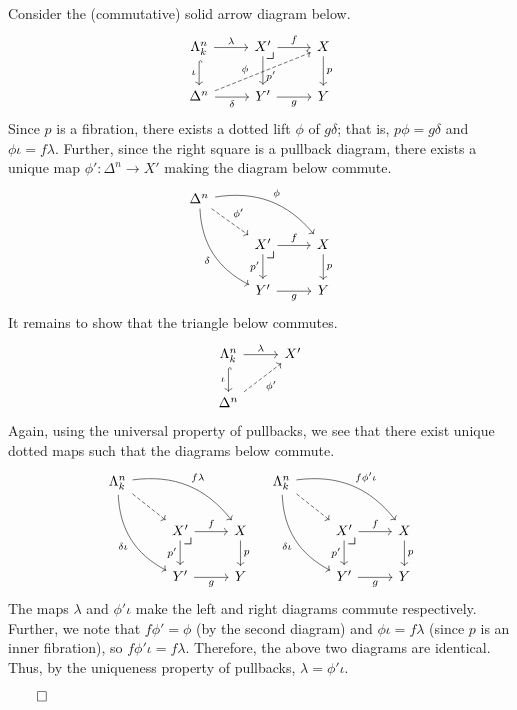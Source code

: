 \documentclass{MetricNotes2023}
\def\done{\begin{flushright}\(\qed\)\end{flushright}}
\begin{document}
\begin{ourproof}
Consider the (commutative) solid arrow diagram below.
\[\begin{tikzcd}
\Lambda^n_k \arrow[r, "\lambda"] \arrow[d, hookrightarrow, swap, "\iota"]  & X' \arrow[d, "p'" {yshift=-4pt}] \arrow[r, "f"] \arrow[dr, phantom, "\scalebox{1.3}{$\lrcorner$}" {xshift=-16pt, yshift=12pt}] & X \arrow[d, "p"]  \\
\Delta^n \arrow[r, swap, "\delta"] \arrow[urr, dashrightarrow, "\phi" {xshift=-8pt, yshift=-4pt}]  & Y' \arrow[r, swap, "g"] & Y
\end{tikzcd}\]
Since \(p\) is a fibration, there exists a dotted lift \(\phi\) of \(g \delta\); that is, \(p\phi = g \delta\) and \(\phi \iota = f \lambda\). Further, since the right square is a pullback diagram, there exists a unique map \(\phi' : \Delta^n \to X'\) making the diagram below commute.
\[\begin{tikzcd}
\Delta^n \arrow[rd, dashrightarrow, "\phi'"] \arrow[drr, bend left, "\phi"] \arrow[ddr, swap, bend right, "\delta"] & &  \\
 & X' \arrow[r, "f"] \arrow[d, swap, "p'"] \arrow[dr, phantom, "\scalebox{1.3}{$\lrcorner$}" {xshift=-16pt, yshift=10pt}]  & X \arrow[d, "p"] \\
 & Y' \arrow[r, swap, "g"] & Y
\end{tikzcd}\]
It remains to show that the triangle below commutes.
\[\begin{tikzcd}
\Lambda^n_k \arrow[r, "\lambda"] \arrow[d, hookrightarrow, swap, "\iota"]  & X' \\
\Delta^n \arrow[ur, dashrightarrow, swap, "\phi'"]  & 
\end{tikzcd}\]
Again, using the universal property of pullbacks, we see that there exist unique dotted maps such that the diagrams below commute.
\[\begin{tikzcd}
\Lambda^n_k \arrow[rd, dashrightarrow, ""] \arrow[drr, bend left, "f \lambda"] \arrow[ddr, swap, bend right, "\delta\iota"] & &  \\
 & X' \arrow[r, "f"] \arrow[d, swap, "p'"] \arrow[dr, phantom, "\scalebox{1.3}{$\lrcorner$}" {xshift=-16pt, yshift=10pt}] & X \arrow[d, "p"] \\
 & Y' \arrow[r, swap, "g"] & Y
\end{tikzcd} \quad \begin{tikzcd}
\Lambda^n_k \arrow[rd, dashrightarrow, ""] \arrow[drr, bend left, "f\phi'\iota"] \arrow[ddr, swap, bend right, "\delta\iota"] & &  \\
 & X' \arrow[r, "f"] \arrow[d, swap, "p'"] \arrow[dr, phantom, "\scalebox{1.3}{$\lrcorner$}" {xshift=-16pt, yshift=10pt}] & X \arrow[d, "p"] \\
 & Y' \arrow[r, swap, "g"] & Y
\end{tikzcd}\]
The maps \(\lambda\) and \(\phi'\iota\) make the left and right diagrams commute respectively. Further, we note that \(f\phi' = \phi\) (by the second diagram) and \(\phi \iota =f \lambda\) (since \(p\) is an inner fibration), so \(f\phi'\iota=f \lambda\). Therefore, the above two diagrams are identical. Thus, by the uniqueness property of pullbacks, \(\lambda = \phi'\iota\). \done
\end{ourproof}
\end{document}
